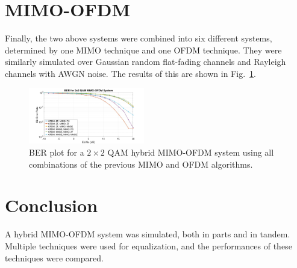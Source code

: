 \documentclass[journal]{IEEEtran}
\begin{document}
\section{MIMO-OFDM} \label{sec:MIMO-OFDM}
Finally, the two above systems were combined into six different systems, determined by one MIMO technique and one OFDM technique. They were similarly simulated over Gaussian random flat-fading channels and Rayleigh channels with AWGN noise. The results of this are shown in Fig.~\ref{fig:mimoofdm_res}.
\begin{figure}[!htbp]
    \centering
    \includegraphics[width = 0.45\textwidth]{MIMOOFDM.jpg}
    \caption{BER plot for a $2\times2$ QAM hybrid MIMO-OFDM system using all combinations of the previous MIMO and OFDM algorithms.}
    \label{fig:mimoofdm_res}
\end{figure}

\section{Conclusion} \label{sec:conc}
A hybrid MIMO-OFDM system was simulated, both in parts and in tandem. Multiple techniques were used for equalization, and the performances of these techniques were compared.


\end{document}
